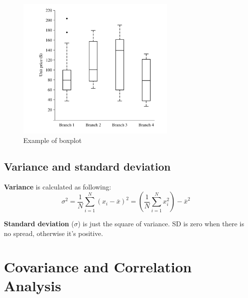\documentclass[12pt,a4paper]{article}
\begin{document}
\begin{figure}[h]
    \centering
    \includegraphics[width=0.7\textwidth]{images/image2.png}
    \caption{Example of boxplot}
    \label{fig:example1}
\end{figure}

\subsection{Variance and standard deviation}

\textbf{Variance} is calculated as following: $$\sigma^2 = \frac{1}{N}\sum_{i = 1}^{N} (x_i - \bar{x})^2 = \left(\frac{1}{N}\sum_{i = 1}^{N} x_i^2\right) - \bar{x}^2$$

\textbf{Standard deviation} ($\sigma$) is just the square of variance. SD is zero when there is no spread, otherwise it's positive.

\section{Covariance and Correlation Analysis}
\end{document}
